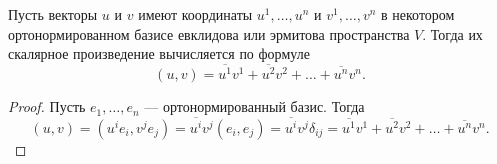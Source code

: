 \begin{proposal}
    Пусть векторы $u$ и $v$ имеют координаты $u^1, \ldots, u^n$ и $v^1, \ldots, v^n$ в некотором ортонормированном базисе евклидова или эрмитова пространства $V$. Тогда их скалярное произведение вычисляется по формуле
    \[
        (u, v) = \overline{u^1}v^1 + \overline{u^2}v^2 + \ldots + \overline{u^n}v^n.
    \]
\end{proposal}

\begin{proof}
    Пусть $e_1, \ldots, e_n$ --- ортонормированный базис. Тогда
    \[
        (u, v) = (u^ie_i, v^je_j) = \overline{u^i}v^j(e_i, e_j) = \overline{u^i}v^j\delta_{ij} = \overline{u^1}v^1 + \overline{u^2}v^2 + \ldots + \overline{u^n}v^n.
    \]
\end{proof}

